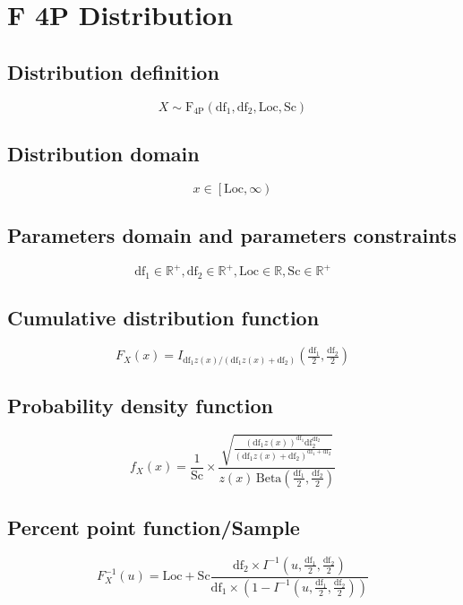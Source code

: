 \documentclass{article}
\begin{document}
\newpage
\section{F 4P Distribution}
\subsection{Distribution definition}
\begin{equation*} X\sim\mathrm{F_{4P}}\left(\text{df}_{1},\text{df}_{2},\text{Loc},\text{Sc}\right) \end{equation*}
\subsection{Distribution domain}
\begin{equation*} x\in\left[\text{Loc},\infty\right) \end{equation*}
\subsection{Parameters domain and parameters constraints}
\begin{equation*} \text{df}_{1}\in\mathbb{R}^{+}, \text{df}_{2}\in\mathbb{R}^{+}, \text{Loc}\in\mathbb{R}, \text{Sc}\in\mathbb{R}^{+} \end{equation*}
\subsection{Cumulative distribution function}
\begin{equation*} F_{X}\left(x\right)=I_{\text{df}_{1} z(x)/(\text{df}_{1} z(x)+\text{df}_{2})}\left (\tfrac{\text{df}_{1}}{2},\tfrac{\text{df}_{2}}{2}\right) \end{equation*}
\subsection{Probability density function}
\begin{equation*} f_{X}\left(x\right)=\frac{1}{\text{Sc}}\times \frac{\sqrt{\frac{(\text{df}_{1} z(x))^{\text{df}_{1}} \text{df}_{2}^{\text{df}_{2}}}{(\text{df}_{1} z(x)+\text{df}_{2})^{\text{df}_{1}+\text{df}_{2}}}}}{z(x)\,\text{Beta}\left(\frac{\text{df}_{1}}{2},\frac{\text{df}_{2}}{2}\right)} \end{equation*}
\subsection{Percent point function/Sample}
\begin{equation*} F^{-1}_{X}\left(u\right)=\text{Loc}+\text{Sc}\frac{\text{df}_{2}\times I^{-1}\left(u,\frac{\text{df}_{1}}{2},\frac{\text{df}_{2}}{2}\right)}{\text{df}_{1}\times \left(1-I^{-1}\left(u,\frac{\text{df}_{1}}{2},\frac{\text{df}_{2}}{2}\right)\right)} \end{equation*}
\end{document}
